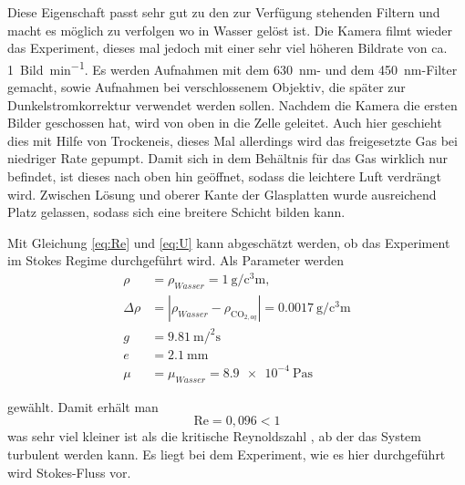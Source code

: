 
Diese Eigenschaft passt sehr gut zu den zur Verfügung stehenden Filtern und macht es möglich zu verfolgen wo \COT in Wasser gelöst ist.
Die Kamera filmt wieder das Experiment, dieses mal jedoch mit einer sehr viel höheren Bildrate von ca. \SI{1}{Bild\per\minute}.  Es werden Aufnahmen mit dem \SI{630}{\nano\meter}- und dem \SI{450}{\nano\meter}-Filter gemacht, sowie Aufnahmen bei verschlossenem Objektiv, die später zur Dunkelstromkorrektur verwendet 
werden sollen. 
Nachdem die Kamera die ersten Bilder geschossen hat, wird von oben \COT in die Zelle geleitet. Auch hier geschieht dies mit Hilfe von 
Trockeneis, dieses Mal allerdings wird das freigesetzte Gas bei niedriger Rate gepumpt. Damit sich in dem Behältnis für das Gas wirklich nur \COT befindet, ist dieses nach oben hin geöffnet, sodass die leichtere Luft verdrängt wird. Zwischen Lösung und oberer Kante der Glasplatten wurde ausreichend Platz gelassen, sodass sich eine breitere \COTm Schicht bilden kann.

Mit Gleichung \ref{eq:Re} und \ref{eq:U} kann abgeschätzt werden, ob das Experiment im Stokes Regime durchgeführt wird. Als Parameter werden 
\begin{align*}
  \rho &= \rho_{Wasser} = \SI{1}{\g\per\cubic\centi\meter}, \\ 
  \Delta\rho &= \left| \rho_{Wasser} - \rho_{\mathrm{CO}_{2, aq}} \right| = \SI[round-precision=4]{0,0017}{\gram\per\cubic\centi\meter} \\
  g &= \SI[round-precision=2]{9,81}{\meter\per\squared\second} \\
  e &= \SI[round-precision=1]{2,1}{\milli\meter} \\
  \mu &= \mu_{Wasser} = \SI{8,9e-4}{\pascal\second}
\end{align*}

gewählt. Damit erhält man
\begin{equation}
 \mathrm{Re} = 0,096 < 1
\end{equation}
was sehr viel kleiner ist als die kritische Reynoldszahl , ab der das System turbulent werden kann. Es liegt bei dem Experiment, wie es hier durchgeführt wird Stokes-Fluss vor.

